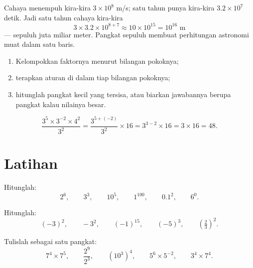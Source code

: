 \begin{example}\label{ex:g8:powers:magnitude}
Cahaya menempuh kira-kira $3 \times 10^8$ m/s; satu tahun punya
kira-kira $3.2 \times 10^7$ detik. Jadi satu tahun cahaya kira-kira
\[
3 \times 3.2 \times 10^{8+7} \approx 10 \times 10^{15} = 10^{16}
\text{ m}
\]
--- sepuluh juta miliar meter. Pangkat sepuluh membuat perhitungan
astronomi muat dalam satu baris.
\end{example}

\begin{method}\label{met:g8:powers:simplify}
\begin{enumerate}
  \item Kelompokkan faktornya menurut bilangan pokoknya;
  \item terapkan aturan  di dalam tiap bilangan pokoknya;
  \item hitunglah pangkat kecil yang tersisa, atau biarkan jawabannya
        berupa pangkat kalau nilainya besar.
\end{enumerate}
\end{method}

\begin{example}\label{ex:g8:powers:simplify}
\[
\frac{3^5 \times 3^{-2} \times 4^2}{3^2}
= \frac{3^{5 + (-2)}}{3^2} \times 16
= 3^{3 - 2} \times 16
= 3 \times 16 = 48 .
\]
\end{example}

\section{Latihan}

\begin{exercise}[$\star$]\label{exo:g8:powers:1}
Hitunglah:
\[
2^6, \qquad 3^3, \qquad 10^5, \qquad 1^{100}, \qquad 0.1^2, \qquad
6^0 .
\]
\end{exercise}

\begin{exercise}[$\star$]\label{exo:g8:powers:2}
Hitunglah:
\[
(-3)^2, \qquad -3^2, \qquad (-1)^{15}, \qquad (-5)^3, \qquad
\left(\tfrac{2}{3}\right)^2 .
\]
\end{exercise}

\begin{exercise}[$\star$]\label{exo:g8:powers:3}
Tulislah sebagai satu pangkat:
\[
7^4 \times 7^5, \qquad
\frac{2^9}{2^3}, \qquad
\left(10^3\right)^4, \qquad
5^6 \times 5^{-2}, \qquad
3^4 \times 7^4 .
\]
\end{exercise}

